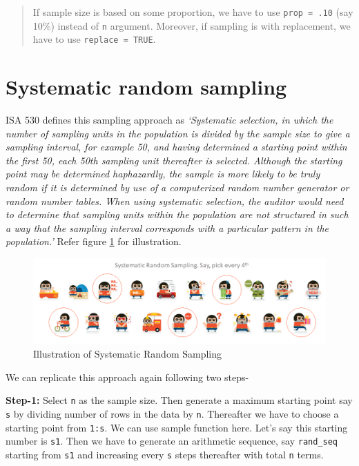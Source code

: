 \documentclass[
]{book}
\begin{document}
\begin{quote}
If sample size is based on some proportion, we have to use \texttt{prop\ =\ .10} (say 10\%) instead of \texttt{n} argument. Moreover, if sampling is with replacement, we have to use \texttt{replace\ =\ TRUE}.
\end{quote}

\hypertarget{srs}{%
\section{Systematic random sampling}\label{srs}}

ISA 530 defines this sampling approach as \emph{`Systematic selection, in which the number of sampling units in the population is divided by the sample size to give a sampling interval, for example 50, and having determined a starting point within the first 50, each 50th sampling unit thereafter is selected. Although the starting point may be determined haphazardly, the sample is more likely to be truly random if it is determined by use of a computerized random number generator or random number tables. When using systematic selection, the auditor would need to determine that sampling units within the population are not structured in such a way that the sampling interval corresponds with a particular pattern in the population.'} Refer figure \ref{fig:systematic} for illustration.

\begin{figure}

{\centering \includegraphics[width=0.99\linewidth]{images/systematic} 

}

\caption{Illustration of Systematic Random Sampling}\label{fig:systematic}
\end{figure}

We can replicate this approach again following two steps-

\textbf{Step-1:} Select \texttt{n} as the sample size. Then generate a maximum starting point say \texttt{s} by dividing number of rows in the data by \texttt{n}. Thereafter we have to choose a starting point from \texttt{1:s}. We can use sample function here. Let's say this starting number is \texttt{s1}. Then we have to generate an arithmetic sequence, say \texttt{rand\_seq} starting from \texttt{s1} and increasing every \texttt{s} steps thereafter with total \texttt{n} terms.
\end{document}
